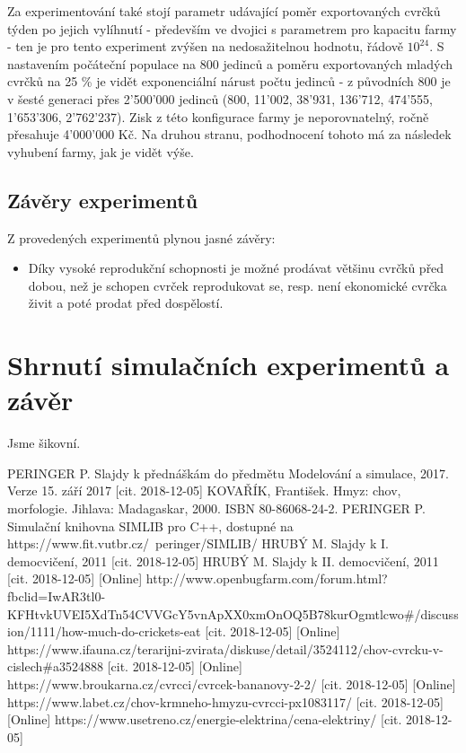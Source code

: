 \documentclass[11pt, a4paper, titlepage]{article}
\begin{document}
    Za experimentování také stojí parametr udávající poměr exportovaných cvrčků týden po jejich vylíhnutí - především ve
    dvojici s parametrem pro kapacitu farmy - ten je pro tento experiment zvýšen na nedosažitelnou hodnotu, řádově $10^24$.
    S nastavením počáteční populace na 800 jedinců a poměru exportovaných mladých cvrčků na 25 \% je vidět exponenciální
    nárust počtu jedinců - z původních 800 je v šesté generaci přes 2'500'000 jedinců (800, 11'002, 38'931, 136'712,
    474'555, 1'653'306, 2'762'237). Zisk z této konfigurace farmy je neporovnatelný, ročně přesahuje 4'000'000 Kč. Na
    druhou stranu, podhodnocení tohoto má za následek vyhubení farmy, jak je vidět výše.

    \subsection{Závěry experimentů}

    Z provedených experimentů plynou jasné závěry:

    \begin{itemize}
        \item Díky vysoké reprodukční schopnosti je možné prodávat většinu cvrčků před dobou, než je schopen cvrček
        reprodukovat se, resp. není ekonomické cvrčka živit a poté prodat před dospělostí.
    \end{itemize}

    \section{Shrnutí simulačních experimentů a závěr}
    Jsme šikovní.

    \begin{thebibliography}{zdroje}
         \label{ims} PERINGER P. Slajdy k přednáškám do předmětu Modelování a simulace, 2017. Verze 15. září 2017 [cit. 2018-12-05]
         \label{kniha} KOVAŘÍK, František. Hmyz: chov, morfologie. Jihlava: Madagaskar, 2000. ISBN 80-86068-24-2.
         \label{simlib} PERINGER P. Simulační knihovna SIMLIB pro C++, dostupné na https://www.fit.vutbr.cz/~peringer/SIMLIB/
         \label{prvnidemo} HRUBÝ M. Slajdy k I. democvičení, 2011 [cit. 2018-12-05]
         \label{druhedemo} HRUBÝ M. Slajdy k II. democvičení, 2011 [cit. 2018-12-05]
         \label{jidlo} [Online] http://www.openbugfarm.com/forum.html?fbclid=IwAR3tl0-KFHtvkUVEI5XdTn54CVVGcY5vnApXX0xmOnOQ5B78kurOgmtlcwo\#/discussion/1111/how-much-do-crickets-eat [cit. 2018-12-05]
         \label{forum} [Online] https://www.ifauna.cz/terarijni-zvirata/diskuse/detail/3524112/chov-cvrcku-v-cislech\#a3524888 [cit. 2018-12-05]
         \label{cena} [Online] https://www.broukarna.cz/cvrcci/cvrcek-bananovy-2-2/ [cit. 2018-12-05]
         \label{topeni} [Online] https://www.labet.cz/chov-krmneho-hmyzu-cvrcci-px1083117/ [cit. 2018-12-05]
         \label{cena_topeni} [Online] https://www.usetreno.cz/energie-elektrina/cena-elektriny/ [cit. 2018-12-05]
    \end{thebibliography}
\end{document}
